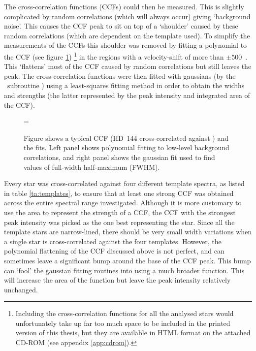 The cross-correlation functions (CCFs) could then be measured. This is
slightly complicated by random correlations (which will always occur)
giving `background noise'. This causes the CCF peak to sit on top of a
`shoulder' caused by these random correlations (which are dependent on
the template used).  To simplify the measurements of the CCFs this
shoulder was removed by fitting a polynomial to the CCF (see figure
\ref{fig:xcorr:example})%
%
\footnote{Including the cross-correlation
functions for all the analysed stars would unfortunately take up far
too much space to be included in the printed version of this thesis,
but they are available in HTML format on the attached CD-ROM (see
appendix \ref{app:cdrom}).}
%
in the regions with a velocity-shift of more than $\pm500$~\kms. This
`flattens' most of the CCF caused by random correlations but
still leaves the peak. The cross-correlation functions were then fitted
with gaussians (by the \dipso\ subroutine \elf) using a least-squares
fitting method in order to obtain the widths and strengths
(the latter represented by the peak intensity and integrated area of the CCF).

\begin{figure} %
\epsfxsize=\figwidth
\setlength{\cen}{(\textwidth / 2) - (\epsfxsize / 2)}
\hspace{\cen}
\caption[Typical CCF and fit]
{\fcfont Figure shows a typical CCF (HD~144 cross-correlated against
\picet) and the fits. Left panel shows polynomial fitting to
low-level background correlations, and right panel shows the gaussian
fit used to find values of full-width half-maximum (FWHM).
}
\label{fig:xcorr:example}
\end{figure}   %

Every star was cross-correlated against four different template
spectra, as listed in table \ref{ta:templates}, to ensure that at
least one strong CCF was obtained across the entire spectral range
investigated. Although it is more 
customary to use the area to represent the strength of a CCF, the CCF
with the strongest peak intensity was picked as the one best
representing the star. Since all the template stars are narrow-lined,
there should be very small width variations when a single star is
cross-correlated against the four templates. However, the polynomial
flattening of the CCF discussed above is not perfect, and can
sometimes leave a significant bump around the base of the CCF
peak. This bump can `fool' the gaussian fitting routines into using a
much broader function. This will increase the area of the function
but leave the peak intensity relatively unchanged.

